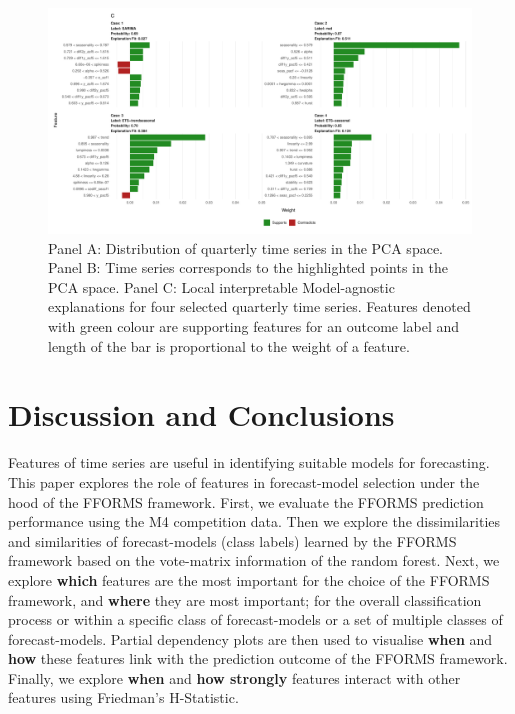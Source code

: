 \documentclass[11pt,a4paper,]{article}
\begin{document}
\begin{figure}[h]

{\centering \includegraphics{figures/quarterlylime2-1} 

}

\caption{Panel A: Distribution of quarterly time series in the PCA space. Panel B: Time series corresponds to the highlighted points in the PCA space. Panel C: Local interpretable Model-agnostic explanations for four selected quarterly time series. Features denoted with green colour are supporting features for an outcome label and length of the bar is proportional to the weight of a feature.}\label{fig:quarterlylime2}
\end{figure}

\hypertarget{conclusions}{%
\section{Discussion and Conclusions}\label{conclusions}}

Features of time series are useful in identifying suitable models for forecasting. This paper explores the role of features in forecast-model selection under the hood of the FFORMS framework. First, we evaluate the FFORMS prediction performance using the M4 competition data. Then we explore the dissimilarities and similarities of forecast-models (class labels) learned by the FFORMS framework based on the vote-matrix information of the random forest. Next, we explore \textbf{which} features are the most important for the choice of the FFORMS framework, and \textbf{where} they are most important; for the overall classification process or within a specific class of forecast-models or a set of multiple classes of forecast-models. Partial dependency plots are then used to visualise \textbf{when} and \textbf{how} these features link with the prediction outcome of the FFORMS framework. Finally, we explore \textbf{when} and \textbf{how strongly} features interact with other features using Friedman's H-Statistic.
\end{document}
